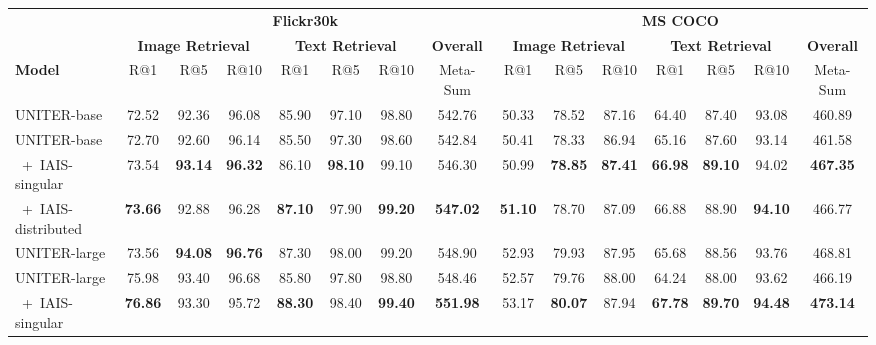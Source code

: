 \documentclass[11pt,a4paper]{article}
\begin{document}
\begin{table*}[t]
\begin{adjustbox}{max width=\textwidth}
\begin{tabular}{@{}lcccccccccccccc@{}}
\toprule
 &
  \multicolumn{7}{c}{\textbf{Flickr30k}} &
  \multicolumn{7}{c}{\textbf{MS COCO}} \\ \cmidrule(lr){2-8} \cmidrule(l){9-15}
 &
  \multicolumn{3}{c}{\textbf{Image Retrieval}} &
  \multicolumn{3}{c}{\textbf{Text Retrieval}} &
  \textbf{Overall} &
  \multicolumn{3}{c}{\textbf{Image Retrieval}} &
  \multicolumn{3}{c}{\textbf{Text Retrieval}} &
  \textbf{Overall} \\ \cmidrule(lr){2-4} \cmidrule(lr){5-7} \cmidrule(lr){8-8} \cmidrule(lr){9-11} \cmidrule(lr){12-14} \cmidrule(l){15-15}     
\textbf{Model} &
  R@1 &
  R@5 &
  R@10 &
  R@1 &
  R@5 &
  R@10 &
  Meta-Sum &
  R@1 &
  R@5 &
  R@10 &
  R@1 &
  R@5 &
  R@10 &
  Meta-Sum \\ \midrule
UNITER-base &
  72.52 &
  92.36 &
  96.08 &
  85.90 &
  97.10 &
  98.80 &
  542.76 &
  50.33 &
  78.52 &
  87.16 &
  64.40 &
  87.40 &
  93.08 &
  460.89 \\
UNITER-base &
  72.70 &
  92.60 &
  96.14 &
  85.50 &
  97.30 &
  98.60 &
  542.84 &
  50.41 &
  78.33 &
  86.94 &
  65.16 &
  87.60 &
  93.14 &
  461.58 \\ \midrule
~+~IAIS-singular &
  73.54 &
  \textbf{93.14} &
  \textbf{96.32} &
  86.10 &
  \textbf{98.10} &
  99.10 &
  546.30 &
  50.99 &
  \textbf{78.85} &
  \textbf{87.41} &
  \textbf{66.98} &
  \textbf{89.10} &
  94.02 &
  \textbf{467.35} \\
~+~IAIS-distributed &
  \textbf{73.66} &
  92.88 &
  96.28 &
  \textbf{87.10} &
  97.90 &
  \textbf{99.20} &
  \textbf{547.02} &
  \textbf{51.10} &
  78.70 &
  87.09 &
  66.88 &
  88.90 &
  \textbf{94.10} &
  466.77 \\ \midrule
UNITER-large &
  73.56 &
  \textbf{94.08} &
  \textbf{96.76} &
  87.30 &
  98.00 &
  99.20 &
  548.90 &
  52.93 &
  79.93 &
  87.95 &
  65.68 &
  88.56 &
  93.76 &
  468.81 \\
UNITER-large &
  75.98 &
  93.40 &
  96.68 &
  85.80 &
  97.80 &
  98.80 &
  548.46 &
  52.57 &
  79.76 &
  88.00 &
  64.24 &
  88.00 &
  93.62 &
  466.19 \\ \midrule
~+~IAIS-singular &
  \textbf{76.86} &
  93.30 &
  95.72 &
  \textbf{88.30} &
  98.40 &
  \textbf{99.40} &
  \textbf{551.98} &
  53.17 &
  \textbf{80.07} &
  87.94 &
  \textbf{67.78} &
  \textbf{89.70} &
  \textbf{94.48} &
  \textbf{473.14} \\

\end{tabular}
\end{adjustbox}
\end{table*}
\end{document}
